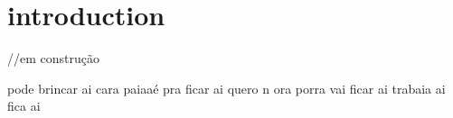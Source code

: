 \section{introduction}//em construção

pode brincar ai cara paiaaé pra ficar ai quero n
ora porra
vai ficar ai  trabaia ai
fica ai